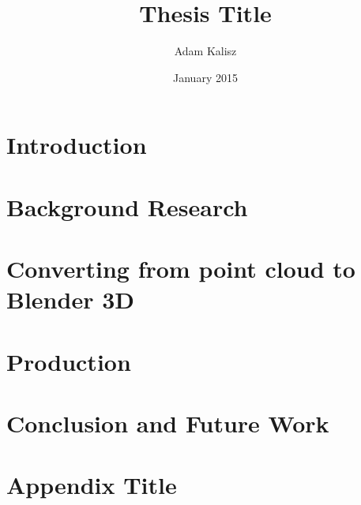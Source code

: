 \documentclass[12pt, twoside, titlepage]{book}
\title{Thesis Title}
\author{Adam Kalisz}
\date{January 2015}
\begin{document}
	
	
	
	
	\thispagestyle{empty}
	
	

	
	
	
	
	\tableofcontents
	
	\listoffigures
	\listoftables
	
	\chapter{Introduction}
	
	\chapter{Background Research}
	
	\chapter{Converting from point cloud to Blender 3D}
	
	\chapter{Production}
	
	\chapter{Conclusion and Future Work}
		
	
	\appendix
	\chapter{Appendix Title}
	
	
	
	\printbibliography	
	
\end{document}
